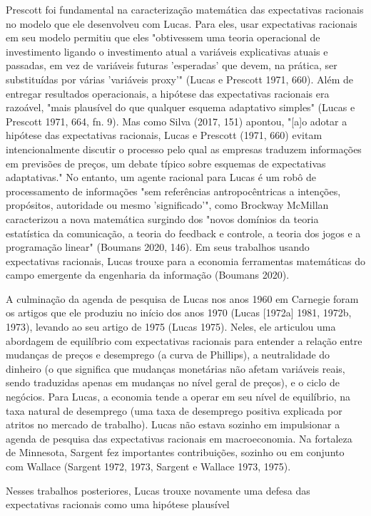 \documentclass[a4paper,12pt]{article}[abntex2]
\begin{document}
Prescott foi fundamental na caracterização matemática das expectativas racionais no modelo que ele desenvolveu com Lucas. Para eles, usar expectativas racionais em seu modelo permitiu que eles "obtivessem uma teoria operacional de investimento ligando o investimento atual a variáveis explicativas atuais e passadas, em vez de variáveis futuras 'esperadas' que devem, na prática, ser substituídas por várias 'variáveis proxy'" (Lucas e Prescott 1971, 660). Além de entregar resultados operacionais, a hipótese das expectativas racionais era razoável, "mais plausível do que qualquer esquema adaptativo simples" (Lucas e Prescott 1971, 664, fn. 9). Mas como Silva (2017, 151) apontou, "[a]o adotar a hipótese das expectativas racionais, Lucas e Prescott (1971, 660) evitam intencionalmente discutir o processo pelo qual as empresas traduzem informações em previsões de preços, um debate típico sobre esquemas de expectativas adaptativas." No entanto, um agente racional para Lucas é um robô de processamento de informações "sem referências antropocêntricas a intenções, propósitos, autoridade ou mesmo 'significado'", como Brockway McMillan caracterizou a nova matemática surgindo dos "novos domínios da teoria estatística da comunicação, a teoria do feedback e controle, a teoria dos jogos e a programação linear" (Boumans 2020, 146). Em seus trabalhos usando expectativas racionais, Lucas trouxe para a economia ferramentas matemáticas do campo emergente da engenharia da informação (Boumans 2020).

A culminação da agenda de pesquisa de Lucas nos anos 1960 em Carnegie foram os artigos que ele produziu no início dos anos 1970 (Lucas [1972a] 1981, 1972b, 1973), levando ao seu artigo de 1975 (Lucas 1975). Neles, ele articulou uma abordagem de equilíbrio com expectativas racionais para entender a relação entre mudanças de preços e desemprego (a curva de Phillips), a neutralidade do dinheiro (o que significa que mudanças monetárias não afetam variáveis reais, sendo traduzidas apenas em mudanças no nível geral de preços), e o ciclo de negócios. Para Lucas, a economia tende a operar em seu nível de equilíbrio, na taxa natural de desemprego (uma taxa de desemprego positiva explicada por atritos no mercado de trabalho). Lucas não estava sozinho em impulsionar a agenda de pesquisa das expectativas racionais em macroeconomia. Na fortaleza de Minnesota, Sargent fez importantes contribuições, sozinho ou em conjunto com Wallace (Sargent 1972, 1973, Sargent e Wallace 1973, 1975).

Nesses trabalhos posteriores, Lucas trouxe novamente uma defesa das expectativas racionais como uma hipótese plausível
\end{document}
